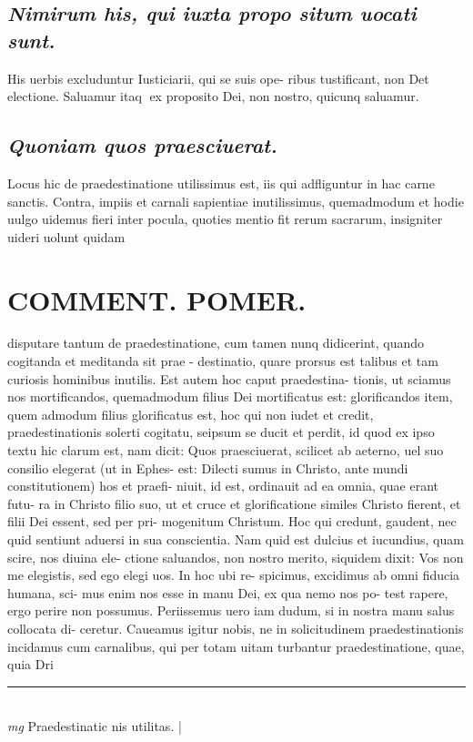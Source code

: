 \documentclass{article}
\begin{document}
\begin{pages}
\subsection*{\textit{Nimirum his, qui iuxta propo situm uocati sunt. }}\pstart His uerbis excluduntur Iusticiarii, qui se suis ope- ribus tustificant, non Det electione. Saluamur itaq ex proposito Dei, non nostro, quicunq saluamur.   \pend
{}
{}
\subsection*{\textit{Quoniam quos praesciuerat. }}\pstart Locus hic de praedestinatione utilissimus est, iis qui adfliguntur in hac carne sanctis. Contra, impiis et carnali sapientiae inutilissimus, quemadmodum et hodie uulgo uidemus fieri inter pocula, quoties mentio fit rerum sacrarum, insigniter uideri uolunt quidam  \pend
\section*{COMMENT. POMER.  }\pstart disputare tantum de praedestinatione, cum tamen nunq didicerint, quando cogitanda et meditanda sit prae - destinatio, quare prorsus est talibus et tam curiosis hominibus inutilis. Est autem hoc caput praedestina- tionis, ut sciamus nos mortificandos, quemadmodum filius Dei mortificatus est: glorificandos item, quem admodum filius glorificatus est, hoc qui non iudet et credit, praedestinationis solerti cogitatu, seipsum se ducit et perdit, id quod ex ipso textu hic clarum est, nam dicit: Quos praesciuerat, scilicet ab aeterno, uel suo consilio elegerat (ut in Ephes- est: Dilecti sumus in Christo, ante mundi constitutionem) hos et praefi- niuit, id est, ordinauit ad ea omnia, quae erant futu- ra in Christo filio suo, ut et cruce et glorificatione similes Christo fierent, et filii Dei essent, sed per pri- mogenitum Christum. Hoc qui credunt, gaudent, nec quid sentiunt aduersi in sua conscientia. Nam quid est dulcius et iucundius, quam scire, nos diuina ele- ctione saluandos, non nostro merito, siquidem dixit: Vos non me elegistis, sed ego elegi uos. In hoc ubi re- spicimus, excidimus ab omni fiducia humana, sci- mus enim nos esse in manu Dei, ex qua nemo nos po- test rapere, ergo perire non possumus. Periissemus uero iam dudum, si in nostra manu salus collocata di- ceretur. Caueamus igitur nobis, ne in solicitudinem praedestinationis incidamus cum carnalibus, qui per totam uitam turbantur praedestinatione, quae, quia Dri  \pend
\vspace{0.5cm}\noindent
\vspace{0.2cm}\rule{1cm}{0.2pt}\\ 
\hspace{0.2cm}\textit{mg}
\footnotesize Praedestinatic nis utilitas. 
\normalsize| 

\end{pages}
\end{document}
